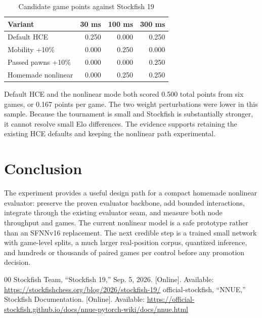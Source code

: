 \documentclass[10pt,conference]{IEEEtran}
\begin{document}
\begin{table}[t]
\centering
\caption{Candidate game points against Stockfish 19}
\begin{tabular}{lrrr}
\toprule
Variant & 30 ms & 100 ms & 300 ms\\
\midrule
Default HCE & 0.250 & 0.000 & 0.250\\
Mobility +10\% & 0.000 & 0.250 & 0.000\\
Passed pawns +10\% & 0.000 & 0.000 & 0.250\\
Homemade nonlinear & 0.000 & 0.250 & 0.250\\
\bottomrule
\end{tabular}
\end{table}

Default HCE and the nonlinear mode both scored 0.500 total points from six games, or 0.167 points per game. The two weight perturbations were lower in this sample. Because the tournament is small and Stockfish is substantially stronger, it cannot resolve small Elo differences. The evidence supports retaining the existing HCE defaults and keeping the nonlinear path experimental.

\section{Conclusion}
The experiment provides a useful design path for a compact homemade nonlinear evaluator: preserve the proven evaluator backbone, add bounded interactions, integrate through the existing evaluator seam, and measure both node throughput and games. The current nonlinear model is a safe prototype rather than an SFNNv16 replacement. The next credible step is a trained small network with game-level splits, a much larger real-position corpus, quantized inference, and hundreds or thousands of paired games per control before any promotion decision.

\begin{thebibliography}{00}
 Stockfish Team, ``Stockfish 19,'' Sep. 5, 2026. [Online]. Available: \url{https://stockfishchess.org/blog/2026/stockfish-19/}
 official-stockfish, ``NNUE,'' Stockfish Documentation. [Online]. Available: \url{https://official-stockfish.github.io/docs/nnue-pytorch-wiki/docs/nnue.html}
\end{thebibliography}
\end{document}
